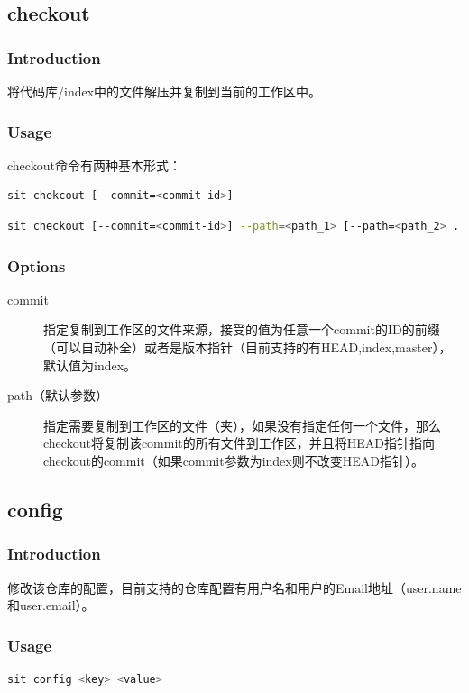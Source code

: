 \documentclass[11pt, a4paper, UTF8]{ctexart}
\begin{document}
\subsection{checkout}
\subsubsection*{Introduction}
将代码库/index中的文件解压并复制到当前的工作区中。
\subsubsection*{Usage}
checkout命令有两种基本形式：
\begin{lstlisting}[language=sh,basicstyle=\small\YaHeiMono,numbers=none]
sit chekcout [--commit=<commit-id>]
\end{lstlisting}
\begin{lstlisting}[language=sh,basicstyle=\small\YaHeiMono,numbers=none]
sit checkout [--commit=<commit-id>] --path=<path_1> [--path=<path_2> ...]
\end{lstlisting}
\subsubsection*{Options}
\begin{description}
	\item[\YaHeiMono commit] 指定复制到工作区的文件来源，接受的值为任意一个commit的ID的前缀（可以自动补全）或者是版本指针（目前支持的有HEAD,index,master），默认值为index。
	\item[\YaHeiMono path（默认参数）] 指定需要复制到工作区的文件（夹），如果没有指定任何一个文件，那么checkout将复制该commit的所有文件到工作区，并且将HEAD指针指向checkout的commit（如果commit参数为index则不改变HEAD指针）。
\end{description}

\subsection{config}
\subsubsection*{Introduction}
修改该仓库的配置，目前支持的仓库配置有用户名和用户的Email地址（user.name和user.email）。
\subsubsection*{Usage}
\begin{lstlisting}[language=sh,basicstyle=\small\YaHeiMono,numbers=none]
sit config <key> <value>
\end{lstlisting}
\end{document}
